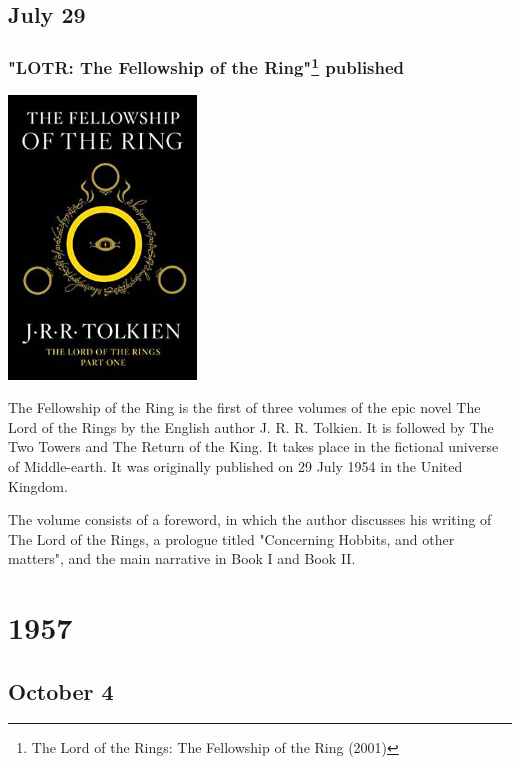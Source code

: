\documentclass[11pt]{report}
\begin{document}
\section{July 29}
\subsection{"LOTR: The Fellowship of the Ring"\protect\footnote{The Lord of the Rings: The Fellowship of the Ring (2001)} published}
\vspace{2mm}\begin{center}\includegraphics[width=5cm]{./img/lotrbook1.jpg}\end{center}
The Fellowship of the Ring is the first of three volumes of the epic novel The Lord of the Rings by the English author J. R. R. Tolkien. It is followed by The Two Towers and The Return of the King. It takes place in the fictional universe of Middle-earth. It was originally published on 29 July 1954 in the United Kingdom.

The volume consists of a foreword, in which the author discusses his writing of The Lord of the Rings, a prologue titled "Concerning Hobbits, and other matters", and the main narrative in Book I and Book II.

\chapter{1957}
\section{October 4}
\end{document}
